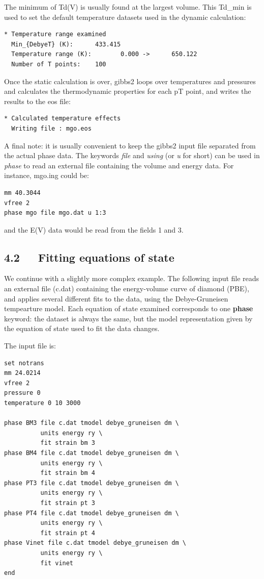 \documentclass[a4paper]{article}
\begin{document}
The minimum of Td(V) is usually found at the largest volume. This
Td\_min is used to set the default temperature datasets used in the
dynamic calculation:
%
\asciilist
\begin{lstlisting}
* Temperature range examined
  Min_{DebyeT} (K):      433.415
  Temperature range (K):        0.000 ->      650.122
  Number of T points:    100
\end{lstlisting}

Once the static calculation is over, gibbs2 loops over temperatures
and pressures and calculates the thermodynamic properties for each pT
point, and writes the results to the eos file:
%
\asciilist
\begin{lstlisting}
* Calculated temperature effects
  Writing file : mgo.eos
\end{lstlisting}

A final note: it is usually convenient to keep the gibbs2 input file
separated from the actual phase data. The keywords \emph{file} and \emph{using}
(or \emph{u} for short) can be used in \emph{phase} to read an external file
containing the volume and energy data. For instance, mgo.ing could be:
%
\gibbslist
\begin{lstlisting}
mm 40.3044
vfree 2
phase mgo file mgo.dat u 1:3
\end{lstlisting}

and the E(V) data would be read from the fields 1 and 3.


\subsection{4.2~~~Fitting equations of state%
  \label{fitting-equations-of-state}%
}

We continue with a slightly more complex example. The following input
file reads an external file (c.dat) containing the energy-volume curve
of diamond (PBE), and applies several different fits to the
data, using the Debye-Gruneisen tempearture model. Each equation of
state examined corresponds to one \textbf{phase} keyword: the dataset is
always the same, but the model representation given by the equation of
state used to fit the data changes.

The input file is:
%
\gibbslist
\begin{lstlisting}
set notrans
mm 24.0214
vfree 2
pressure 0
temperature 0 10 3000

phase BM3 file c.dat tmodel debye_gruneisen dm \
          units energy ry \
          fit strain bm 3
phase BM4 file c.dat tmodel debye_gruneisen dm \
          units energy ry \
          fit strain bm 4
phase PT3 file c.dat tmodel debye_gruneisen dm \
          units energy ry \
          fit strain pt 3
phase PT4 file c.dat tmodel debye_gruneisen dm \
          units energy ry \
          fit strain pt 4
phase Vinet file c.dat tmodel debye_gruneisen dm \
          units energy ry \
          fit vinet
end
\end{lstlisting}
\end{document}

